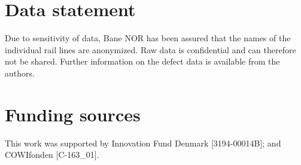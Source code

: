 \section*{Data statement}
Due to sensitivity of data, Bane NOR has been assured that the names of the individual rail lines are anonymized. Raw data is confidential and can therefore not be shared. Further information on the defect data is available from the authors.

\section*{Funding sources}
This work was supported by Innovation Fund Denmark [3194-00014B]; and COWIfonden [C-163\_01].

